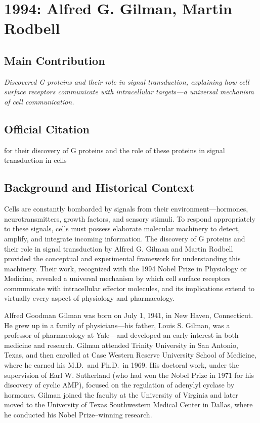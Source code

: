 \chapter[1994 --- Gilman et al.]{1994: Alfred G. Gilman, Martin Rodbell}
\label{ch:1994_Gilman}

\section*{Main Contribution}

\textit{Discovered G proteins and their role in signal transduction, explaining how cell surface receptors communicate with intracellular targets---a universal mechanism of cell communication.}\cite{nobel-1994,lecture-1994}

\section{Official Citation}

for their discovery of G proteins and the role of these proteins in signal transduction in cells

\section{Background and Historical Context}

Cells are constantly bombarded by signals from their environment---hormones, neurotransmitters, growth factors, and sensory stimuli. To respond appropriately to these signals, cells must possess elaborate molecular machinery to detect, amplify, and integrate incoming information. The discovery of G proteins and their role in signal transduction by Alfred G. Gilman and Martin Rodbell provided the conceptual and experimental framework for understanding this machinery. Their work, recognized with the 1994 Nobel Prize in Physiology or Medicine, revealed a universal mechanism by which cell surface receptors communicate with intracellular effector molecules, and its implications extend to virtually every aspect of physiology and pharmacology.

Alfred Goodman Gilman was born on July 1, 1941, in New Haven, Connecticut. He grew up in a family of physicians---his father, Louis S. Gilman, was a professor of pharmacology at Yale---and developed an early interest in both medicine and research. Gilman attended Trinity University in San Antonio, Texas, and then enrolled at Case Western Reserve University School of Medicine, where he earned his M.D.\ and Ph.D.\ in 1969. His doctoral work, under the supervision of Earl W. Sutherland (who had won the Nobel Prize in 1971 for his discovery of cyclic AMP), focused on the regulation of adenylyl cyclase by hormones. Gilman joined the faculty at the University of Virginia and later moved to the University of Texas Southwestern Medical Center in Dallas, where he conducted his Nobel Prize--winning research.

